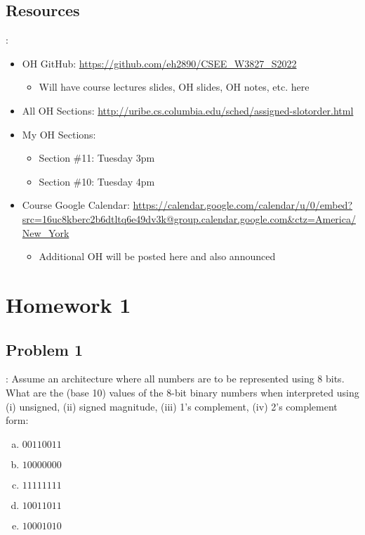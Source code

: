 \documentclass{../slides}
\begin{document}
\subsection{Resources}
\begin{frame}{\secname: \subsecname}
    \begin{itemize}
        \item OH GitHub: \url{https://github.com/eh2890/CSEE_W3827_S2022}
        \begin{itemize}
            \item Will have course lectures slides, OH slides, OH notes, etc. here
        \end{itemize}
        \item All OH Sections: \url{http://uribe.cs.columbia.edu/sched/assigned-slotorder.html}
        \item My OH Sections:
        \begin{itemize}
            \item Section \#11: Tuesday 3pm
            \item Section \#10: Tuesday 4pm
        \end{itemize}
        \item Course Google Calendar: \url{https://calendar.google.com/calendar/u/0/embed?src=16uc8kberc2b6dtltq6e49dv3k@group.calendar.google.com&ctz=America/New_York}
        \begin{itemize}
            \item Additional OH will be posted here and also announced
        \end{itemize}
    \end{itemize}
\end{frame}

\section{Homework 1}
\subsection{Problem 1}
\begin{frame}{\secname: \subsecname}
    Assume an architecture where all numbers are to be represented using 8 bits. What are the (base 10) values of the 8-bit binary numbers when interpreted using (i) unsigned, (ii) signed magnitude, (iii) 1’s complement, (iv) 2’s complement form:
    \begin{enumerate}[(a)]
        \item $00110011$
        \item $10000000$
        \item $11111111$
        \item $10011011$
        \item $10001010$
    \end{enumerate}
\end{frame}
\end{document}
